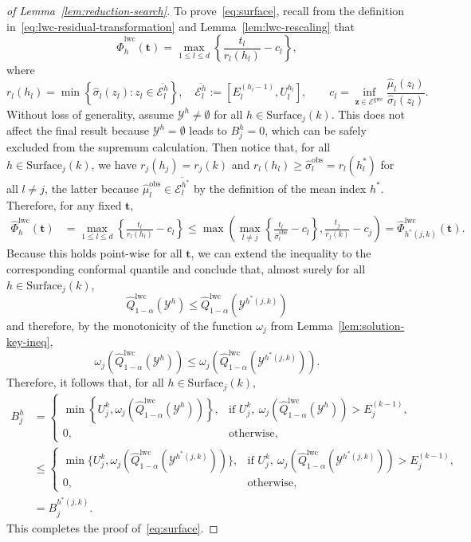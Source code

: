 \begin{proof}[of Lemma~\ref{lem:reduction-search}]
To prove~\eqref{eq:surface}, recall from the definition in~\eqref{eq:lwc-residual-transformation} and Lemma~\ref{lem:lwc-rescaling} that
\[
\hat{\Phi}^{\mathrm{lwc}}_h(\mathbf t)  = \max_{1\leq l \leq d} \left\{\frac{t_l}{r_l(h_l)} - c_l\right\},
\]
where
\[
r_l(h_l) = \min\left\{\hat{\sigma}_l(z_l): z_l \in \overline{\mathcal{E}^h_l}\right\},
\quad \overline{\mathcal{E}^h_l} := \left[E^{(h_l-1)}_l, U^{h_l}_l\right],
\qquad c_l = \inf_{\mathbf z \in \mathcal{E}^{\mathrm{gwc}}}\frac{\hat{\mu}_l(z_l)}{\hat{\sigma}_l(z_l)}.
\]
Without loss of generality, assume $\mathcal{Y}^h \neq \emptyset$ for all $h \in \mathrm{Surface}_j(k)$. This does not affect the final result because $\mathcal{Y}^h = \emptyset$ leads to $B^h_j = 0$, which can be safely excluded from the supremum calculation. Then notice that, for all $h \in \mathrm{Surface}_j(k)$, we have $r_j(h_j) = r_j(k)$ and $r_l(h_l) \geq \hat{\sigma}^\mathrm{obs}_l = r_l({h^*_l})$ for all $l \neq j$, the latter because $\hat{\mu}^\mathrm{obs}_l \in \overline{\mathcal{E}^{h^*}_l}$ by the definition of the mean index $h^*$. Therefore, for any fixed $\mathbf t$,
\begin{align*}
    \hat{\Phi}^{\mathrm{lwc}}_h(\mathbf t) & = \max_{1\leq l \leq d} \left\{\frac{t_l}{r_l(h_l)} - c_l\right\}
    \leq  \max\left(\max_{l\neq j} \left\{\frac{t_l}{\hat{\sigma}^\mathrm{obs}_l} - c_l\right\}, \frac{t_j}{r_j(k)} - c_j\right)
    = \hat{\Phi}^{\mathrm{lwc}}_{h^*(j,k)}(\mathbf t).
\end{align*}
Because this holds point-wise for all $\mathbf t$, we can extend the inequality to the corresponding conformal quantile and conclude that, almost surely for all $h \in \mathrm{Surface}_j(k)$,
\[
\hat{Q}^\mathrm{lwc}_{1-\alpha}(\mathcal{Y}^h) \leq \hat{Q}^\mathrm{lwc}_{1-\alpha}(\mathcal{Y}^{h^*(j,k)})
\]
and therefore, by the monotonicity of the function $\omega_j$ from Lemma~\ref{lem:solution-key-ineq},
\[
\omega_j(\hat{Q}^\mathrm{lwc}_{1-\alpha}(\mathcal{Y}^h)) \leq \omega_j(\hat{Q}^\mathrm{lwc}_{1-\alpha}(\mathcal{Y}^{h^*(j,k)})).
\]
Therefore, it follows that, for all $h \in \mathrm{Surface}_j(k)$,
\begin{align*}
B^h_j &=\begin{cases}
\min\left\{U^{k}_j, \omega_j(\hat{Q}^{\mathrm{lwc}}_{1-\alpha}(\mathcal{Y}^h))\right\}, 
& \text{if } U^{k}_j,\ \omega_j(\hat{Q}^{\mathrm{lwc}}_{1-\alpha}(\mathcal{Y}^h)) > E^{(k-1)}_j,\\[0.4em]
0, & \text{otherwise},
 \end{cases}\\
&\leq \begin{cases}
\min\!\bigl\{U^{k}_j, \omega_j(\hat{Q}^{\mathrm{lwc}}_{1-\alpha}(\mathcal{Y}^{h^*(j,k)}))\bigr\}, 
& \text{if } U^{k}_j,\ \omega_j(\hat{Q}^{\mathrm{lwc}}_{1-\alpha}(\mathcal{Y}^{h^*(j,k)})) > E^{(k-1)}_j,\\[0.4em]
0, & \text{otherwise},
\end{cases}\\
&=B^{h^*(j,k)}_j.
\end{align*}
This completes the proof of~\eqref{eq:surface}. 


\end{proof}
